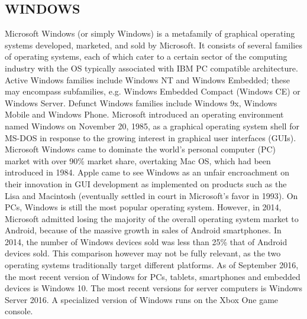 \documentclass[11pt]{report} %
\begin{document}
\subsection{WINDOWS}
\label{subsec:WINDOWS}
Microsoft Windows (or simply Windows) \cite{Maluth:2012:MWG:2464833} is a metafamily of graphical operating systems developed, marketed, and sold by Microsoft. It consists of several families of operating systems, each of which cater to a certain sector of the computing industry with the OS typically associated with IBM PC compatible architecture. Active Windows families include Windows NT and Windows Embedded; these may encompass subfamilies, e.g. Windows Embedded Compact (Windows CE) or Windows Server. Defunct Windows families include Windows 9x, Windows Mobile and Windows Phone.
Microsoft introduced an operating environment named Windows on November 20, 1985, as a graphical operating system shell for MS-DOS in response to the growing interest in graphical user interfaces (GUIs). Microsoft Windows came to dominate the world's personal computer (PC) market with over 90\% market share, overtaking Mac OS, which had been introduced in 1984. Apple came to see Windows as an unfair encroachment on their innovation in GUI development as implemented on products such as the Lisa and Macintosh (eventually settled in court in Microsoft's favor in 1993). On PCs, 
Windows is still the most popular operating system. However, in 2014, Microsoft admitted losing the majority of the overall operating system market to Android, because of the massive growth in sales of Android smartphones. In 2014, the number of Windows devices sold was less than 25\% that of Android devices sold. This comparison however may not be fully relevant, as the two operating systems traditionally target different platforms.
As of September 2016, the most recent version of Windows for PCs, tablets, smartphones and embedded devices is Windows 10. The most recent versions for server computers is Windows Server 2016. A specialized version of Windows runs on the Xbox One game console.
\end{document}
